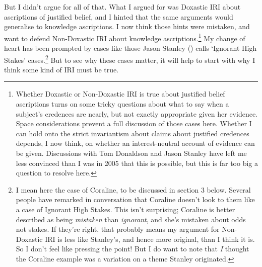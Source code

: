 \documentclass[
  11pt,
  letterpaper,
  DIV=11,
  numbers=noendperiod,
  twoside]{scrartcl}
\begin{document}
But I didn't argue for all of that. What I argued for was Doxastic IRI
about ascriptions of justified belief, and I hinted that the same
arguments would generalise to knowledge ascriptions. I now think those
hints were mistaken, and want to defend Non-Doxastic IRI about knowledge
ascriptions.\footnote{Whether Doxastic or Non-Doxastic IRI is true about
  justified belief ascriptions turns on some tricky questions about what
  to say when a subject's credences are nearly, but not exactly
  appropriate given her evidence. Space considerations prevent a full
  discussion of those cases here. Whether I can hold onto the strict
  invariantism about claims about justified credences depends, I now
  think, on whether an interest-neutral account of evidence can be
  given. Discussions with Tom Donaldson and Jason Stanley have left me
  less convinced than I was in 2005 that this is possible, but this is
  far too big a question to resolve here.} My change of heart has been
prompted by cases like those Jason Stanley
() calls `Ignorant High Stakes'
cases.\footnote{I mean here the case of Coraline, to be discussed in
  section 3 below. Several people have remarked in conversation that
  Coraline doesn't look to them like a case of Ignorant High Stakes.
  This isn't surprising; Coraline is better described as being
  \emph{mistaken} than \emph{ignorant}, and she's mistaken about odds
  not stakes. If they're right, that probably means my argument for
  Non-Doxastic IRI is less like Stanley's, and hence more original, than
  I think it is. So I don't feel like pressing the point! But I do want
  to note that \emph{I} thought the Coraline example was a variation on
  a theme Stanley originated.} But to see why these cases matter, it
will help to start with why I think some kind of IRI must be true.
\end{document}
